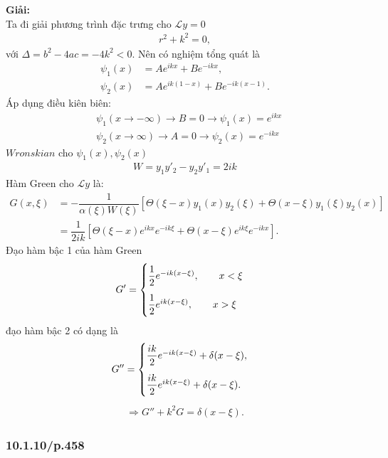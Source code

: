 \documentclass{report}
\newcommand{\f}[2]{\dfrac{#1}{#2}}
\begin{document}
\textbf{Giải:} \\
Ta đi giải phương trình đặc trưng cho $\mathcal{L} y = 0$
\begin{align*}
	r^2 + k^2 = 0,
\end{align*}
với $\Delta = b^2 - 4ac = -4k^2 < 0$. Nên có nghiệm tổng quát là
\begin{align*}
	\psi_1(x) & = Ae^{ikx} + Be^{-ikx},           \\
	\psi_2(x) & = Ae^{ik(1 - x)} + Be^{-ik(x-1)}.
\end{align*}
Áp dụng điều kiên biên:
\begin{align*}
	 & \psi_1(x\rightarrow -\infty) \rightarrow B = 0 \rightarrow \psi_1(x) = e^{ikx} \\
	 & \psi_2(x\rightarrow \infty) \rightarrow A = 0 \rightarrow \psi_2(x) = e^{-ikx}
\end{align*}
$Wronskian$ cho $\psi_1(x),\psi_2(x)$
\begin{align*}
	W = y_1 y'_2 - y_2 y'_1 = 2ik
\end{align*}
Hàm Green cho $\mathcal{L} y$ là:
\begin{align*}
	G(x,\xi)
	 & = -\f{1}{\alpha(\xi) W(\xi)} \left[ \Theta(\xi - x)y_{1}(x)y_{2}(\xi) + \Theta(x-\xi)y_{1}(\xi)y_{2}(x) \right] \\
	 & = \f{1}{2ik} \left[ \Theta(\xi - x) e^{ikx} e^{-ik\xi} + \Theta(x-\xi) e^{ik\xi} e^{-ikx}  \right].
\end{align*}
Đạo hàm bậc 1 của hàm Green
\begin{align*}
	G' =
	\begin{cases}
		\f{1}{2} e^{-ik(x - \xi)}  ,\quad \quad x < \xi \\
		\noalign{\vskip9pt}
		\f{1}{2} e^{ik(x - \xi)}  ,\quad \quad x > \xi  \\
	\end{cases}
\end{align*}
đạo hàm bậc 2 có dạng là
\begin{align*}
	G'' =
	\begin{cases}
		\f{ik}{2} e^{-ik(x - \xi)} + \delta (x-\xi) , \\
		\noalign{\vskip9pt}
		\f{ik}{2} e^{ik(x - \xi)} + \delta (x-\xi).
	\end{cases}
\end{align*}
\begin{align*}
	\Rightarrow G'' + k^2 G = \delta (x - \xi).
\end{align*}

\subsubsection{10.1.10/p.458}
\end{document}
